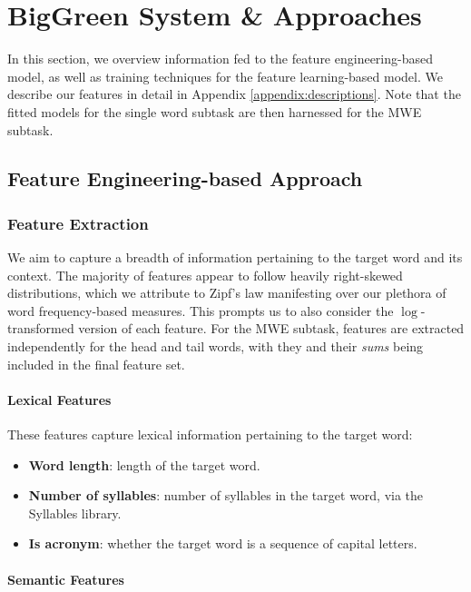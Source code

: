 \documentclass{dcthesis}
\theoremstyle{definition}
\theoremstyle{remark}
\begin{document}
\chapter{BigGreen System \& Approaches}

In this section, we overview information fed to the feature engineering-based model, as well as training techniques for the feature learning-based model. We describe our features in detail in Appendix \ref{appendix:descriptions}. Note that the fitted models for the single word subtask are then harnessed for the MWE subtask.

\section{Feature Engineering-based Approach}

\subsection{Feature Extraction}

We aim to capture a breadth of information pertaining to the target word and its context. The majority of features appear to follow heavily right-skewed distributions, which we attribute to Zipf's law manifesting over our plethora of word frequency-based measures. This prompts us to also consider the $\log$-transformed version of each feature. For the MWE subtask, features are extracted independently for the head and tail words, with they and their \textit{sums} being included in the final feature set.

\subsubsection{Lexical Features}

These features capture lexical information pertaining to the target word:

\begin{itemize}
  \item \textbf{Word length}: length of the target word.
  \item \textbf{Number of syllables}: number of syllables in the target word, via the Syllables library.
  \item \textbf{Is acronym}: whether the target word is a sequence of capital letters.
\end{itemize}
  
\subsubsection{Semantic Features}
\end{document}
